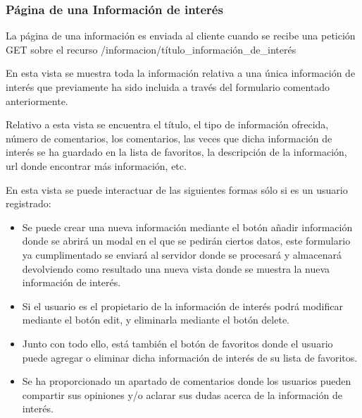 \subsubsection{Página de una Información de interés }
\label{subsubsec:informacion}


La página de una información es enviada al cliente cuando se recibe una petición GET sobre el recurso /informacion/{título\_información\_de\_interés}


En esta vista se muestra toda la información relativa a una única información de interés que previamente ha sido incluida a través del formulario comentado anteriormente. 


Relativo a esta vista se encuentra el título, el tipo de información ofrecida, número de comentarios, los comentarios, las veces que dicha información de interés se ha guardado en la lista de favoritos, la descripción de la información, url donde encontrar más información, etc.


En esta vista se puede interactuar de las siguientes formas sólo si es un usuario registrado:



\begin{itemize}
\item Se puede crear una nueva información  mediante el botón añadir información donde se abrirá un modal en el que se pedirán ciertos datos, este formulario ya cumplimentado se enviará al servidor donde se procesará y almacenará devolviendo como resultado una nueva vista donde se muestra la nueva información de interés.
\item Si el usuario es el propietario de la información de interés podrá modificar mediante el botón edit, y eliminarla mediante el botón delete.
\item Junto con todo ello, está también el botón de favoritos donde el usuario puede agregar o eliminar dicha información de interés de su lista de favoritos.  
\item Se ha proporcionado un apartado de comentarios donde los usuarios pueden compartir sus opiniones y/o aclarar sus dudas acerca de la información de interés.
\end{itemize}


